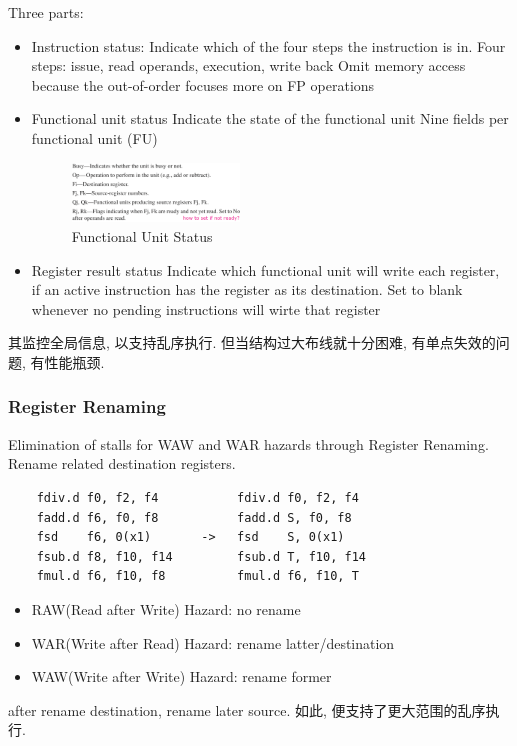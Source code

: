 Three parts:
\begin{itemize}
    \item Instruction status: 
    \subitem Indicate which of the four steps the instruction is in. 
    \subitem Four steps: issue, read operands, execution, write back
    \subitem Omit memory access because the out-of-order focuses more on FP operations
    \item Functional unit status
    \subitem Indicate the state of the functional unit
    \subitem Nine fields per functional unit (FU)
    \begin{figure}[!htb]
        \centering
        \includegraphics[width=0.42\textwidth]{pic/CA3/Functional Unit Status}
        \caption{Functional Unit Status}
    \end{figure}
    \item Register result status
    \subitem Indicate which functional unit will write each register, if an active instruction has the register as its destination.
    \subitem Set to blank whenever no pending instructions will wirte that register
\end{itemize}
其监控全局信息, 以支持乱序执行. 但当结构过大布线就十分困难, 有单点失效的问题, 有性能瓶颈. 

\subsubsection{Register Renaming}
Elimination of stalls for WAW and WAR hazards through Register Renaming. Rename related destination registers. 


\begin{verbatim}
    fdiv.d f0, f2, f4           fdiv.d f0, f2, f4
    fadd.d f6, f0, f8           fadd.d S, f0, f8
    fsd    f6, 0(x1)       ->   fsd    S, 0(x1)
    fsub.d f8, f10, f14         fsub.d T, f10, f14
    fmul.d f6, f10, f8          fmul.d f6, f10, T
\end{verbatim}

\begin{itemize}\scriptsize
    \item RAW(Read after Write) Hazard: no rename
    \item WAR(Write after Read) Hazard: rename latter/destination
    \item WAW(Write after Write) Hazard: rename former
\end{itemize}
after rename destination, rename later source. 如此, 便支持了更大范围的乱序执行. 


